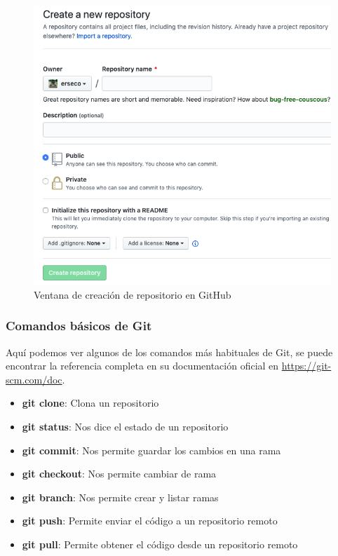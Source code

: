 \begin{figure}[H]
\centering
\includegraphics[width=1.0\textwidth]{../images/git2}
\caption{Ventana de creación de repositorio en GitHub}
\label{fig:git2}
\end{figure}

\subsubsection{Comandos básicos de Git}

Aquí podemos ver algunos de los comandos más habituales de Git, se puede encontrar la referencia completa en su documentación oficial en \url{https://git-scm.com/doc}.

\begin{itemize}
  \item \textbf{git clone}: Clona un repositorio
  \item \textbf{git status}: Nos dice el estado de un repositorio
  \item \textbf{git commit}: Nos permite guardar los cambios en una rama
  \item \textbf{git checkout}: Nos permite cambiar de rama
  \item \textbf{git branch}: Nos permite crear y listar ramas
  \item \textbf{git push}: Permite enviar el código a un repositorio remoto
  \item \textbf{git pull}: Permite obtener el código desde un repositorio remoto
\end{itemize}


